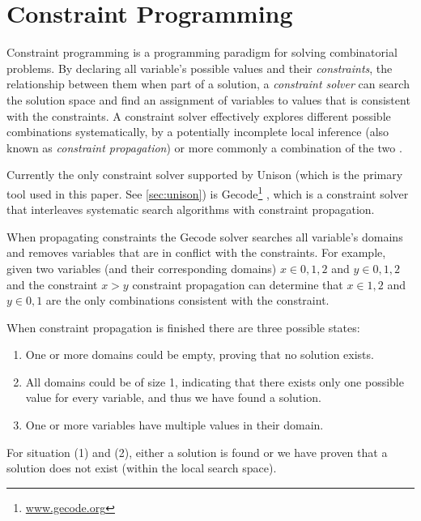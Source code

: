 \section{Constraint Programming}

Constraint programming is a programming paradigm for solving combinatorial problems.
By declaring all variable's possible values and their \textit{constraints}, the relationship
between them when part of a solution, a \textit{constraint solver} can search the solution
space and find an assignment of variables to values that is consistent with the constraints.
A constraint solver effectively explores different possible combinations systematically,
by a potentially incomplete local inference (also known as \textit{constraint propagation})
or more commonly a combination of the two \cite{handbook-constraint-programming}.

Currently the only constraint solver supported by Unison (which is the primary tool used
in this paper. See \ref{sec:unison}) is Gecode\footnote{\url{www.gecode.org}}
\cite{unison-docs}, which is a constraint solver that interleaves systematic search algorithms
with constraint propagation\cite{MPG}.

When propagating constraints the Gecode solver searches all variable's domains and removes
variables that are in conflict with the constraints\cite[Section~23.1]{MPG}. For example,
given two variables (and their corresponding domains) $x \in {0,1,2}$ and $y \in {0,1,2}$
and the constraint $x > y$ constraint propagation can determine that $x \in {1, 2}$ and
$y \in {0, 1}$ are the only combinations consistent with the constraint.

When constraint propagation is finished there are three possible states:

\begin{enumerate}
	\item One or more domains could be empty, proving that no solution exists.
	\item	All domains could be of size 1, indicating that there exists only one possible
		value for every variable, and thus we have found a solution.
	\item One or more variables have multiple values in their domain.
\end{enumerate}

For situation (1) and (2), either a solution is found or we have proven that a solution
does not exist (within the local search space).

